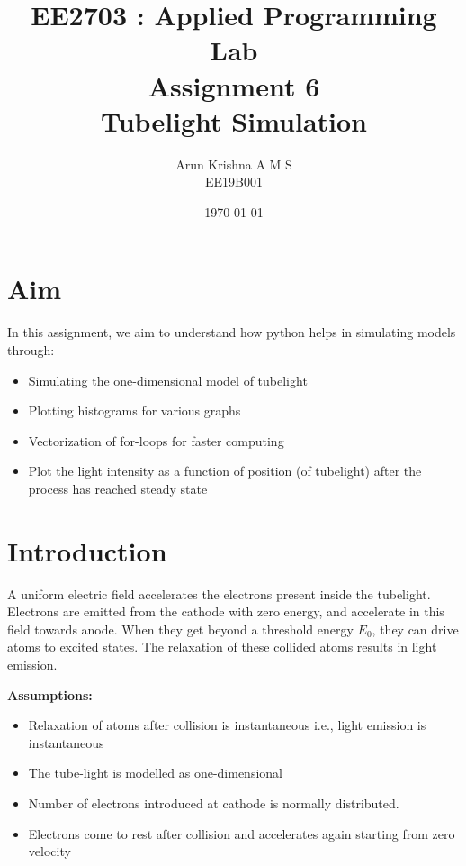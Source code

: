 \documentclass[12pt, a4paper]{report}
\title{\textbf{EE2703 : Applied Programming Lab \\ Assignment 6 \\ Tubelight Simulation}} %
\author{Arun Krishna A M S \\ EE19B001} %
\date{\today} %
\begin{document}
		
		
\maketitle %
\justifying

\section*{Aim}
In this assignment, we aim to understand how python helps in simulating models through:
\begin{itemize}
  	\item Simulating the one-dimensional model of tubelight
  	\item Plotting histograms for various graphs 
  	\item Vectorization of for-loops for faster computing
  	\item Plot the light intensity as a function of position (of tubelight) after the process has reached steady state
\end{itemize}

\section*{Introduction}

A uniform electric field accelerates the electrons present inside the tubelight.  Electrons are emitted from the cathode with zero energy, and accelerate in this field towards anode.  When they get beyond a threshold energy $E_0$, they can drive atoms to excited states. The relaxation of these collided atoms results in light emission. 

\textbf{Assumptions:}
\begin{itemize}
  	\item Relaxation of atoms after collision is instantaneous i.e., light emission is instantaneous
  	\item The tube-light is modelled as one-dimensional
  	\item Number of electrons introduced at cathode is normally distributed. 
  	\item Electrons come to rest after collision and accelerates again starting from zero velocity
\end{itemize}
\end{document}
